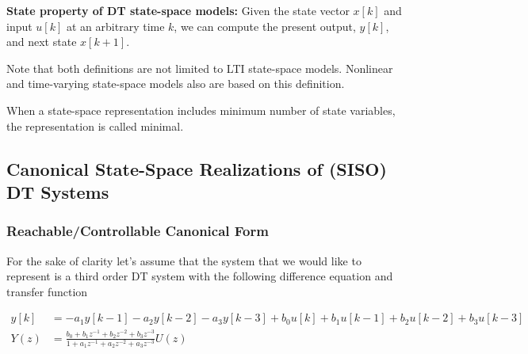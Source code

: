 \documentclass[twoside]{article}
\begin{document}
\textbf{State property of DT state-space models:} 
Given the state vector $x[k]$ and input $u[k]$ at an arbitrary time $k$, 
we can compute the present output, $y[k]$, and next state $x[k+1]$.

Note that both definitions are not limited to LTI state-space models. 
Nonlinear and time-varying state-space models also are based on this 
definition. 

When a state-space representation includes minimum number of state 
variables, the representation is called minimal. 

\subsection*{Canonical State-Space Realizations of (SISO) DT Systems}

\subsubsection*{Reachable/Controllable Canonical Form}

For the sake of clarity let's assume that the system that we would
like to represent is a third order DT system with the following difference equation
and transfer function

\begin{align*}
y[k] &=  -a_1 y[k-1] - a_2 y[k-2] - a_3 y[k-3] 
+ b_0 u[k] + b_1 u[k-1] + b_2 u[k-2] + b_3 u[k-3] \\ 
Y(z) &= \frac{b_0 + b_1 z^{-1} + b_2 z^{-2} + b_3 z^{-3}}{1+ a_1 z^{-1} + a_2 z^{-2} + a_3 z^{-3}} U(z)
\end{align*}
\end{document}
